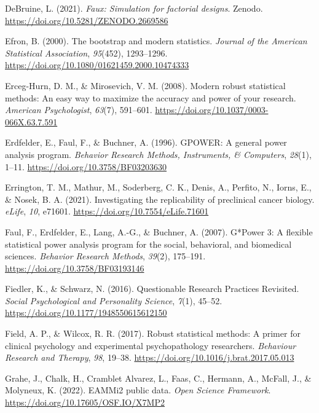 \documentclass[
  man]{apa7}
\newlength{\cslhangindent}
\newenvironment{CSLReferences}[2] %
 {\begin{list}{}{%
  \setlength{\itemindent}{0pt}
  \setlength{\leftmargin}{0pt}
  \setlength{\parsep}{0pt}
  \ifodd #1
   \setlength{\leftmargin}{\cslhangindent}
   \setlength{\itemindent}{-1\cslhangindent}
  \fi
  \setlength{\itemsep}{#2\baselineskip}}}
 {\end{list}}
\begin{document}
\begin{CSLReferences}{1}{0}
DeBruine, L. (2021). \emph{Faux: Simulation for factorial designs}. Zenodo. \url{https://doi.org/10.5281/ZENODO.2669586}

Efron, B. (2000). The bootstrap and modern statistics. \emph{Journal of the American Statistical Association}, \emph{95}(452), 1293--1296. \url{https://doi.org/10.1080/01621459.2000.10474333}

Erceg-Hurn, D. M., \& Mirosevich, V. M. (2008). Modern robust statistical methods: An easy way to maximize the accuracy and power of your research. \emph{American Psychologist}, \emph{63}(7), 591--601. \url{https://doi.org/10.1037/0003-066X.63.7.591}

Erdfelder, E., Faul, F., \& Buchner, A. (1996). GPOWER: A general power analysis program. \emph{Behavior Research Methods, Instruments, \& Computers}, \emph{28}(1), 1--11. \url{https://doi.org/10.3758/BF03203630}

Errington, T. M., Mathur, M., Soderberg, C. K., Denis, A., Perfito, N., Iorns, E., \& Nosek, B. A. (2021). Investigating the replicability of preclinical cancer biology. \emph{eLife}, \emph{10}, e71601. \url{https://doi.org/10.7554/eLife.71601}

Faul, F., Erdfelder, E., Lang, A.-G., \& Buchner, A. (2007). G*Power 3: A flexible statistical power analysis program for the social, behavioral, and biomedical sciences. \emph{Behavior Research Methods}, \emph{39}(2), 175--191. \url{https://doi.org/10.3758/BF03193146}

Fiedler, K., \& Schwarz, N. (2016). Questionable Research Practices Revisited. \emph{Social Psychological and Personality Science}, \emph{7}(1), 45--52. \url{https://doi.org/10.1177/1948550615612150}

Field, A. P., \& Wilcox, R. R. (2017). Robust statistical methods: A primer for clinical psychology and experimental psychopathology researchers. \emph{Behaviour Research and Therapy}, \emph{98}, 19--38. \url{https://doi.org/10.1016/j.brat.2017.05.013}

Grahe, J., Chalk, H., Cramblet Alvarez, L., Faas, C., Hermann, A., McFall, J., \& Molyneux, K. (2022). EAMMi2 public data. \emph{Open Science Framework}. \url{https://doi.org/10.17605/OSF.IO/X7MP2}


\end{CSLReferences}
\end{document}
